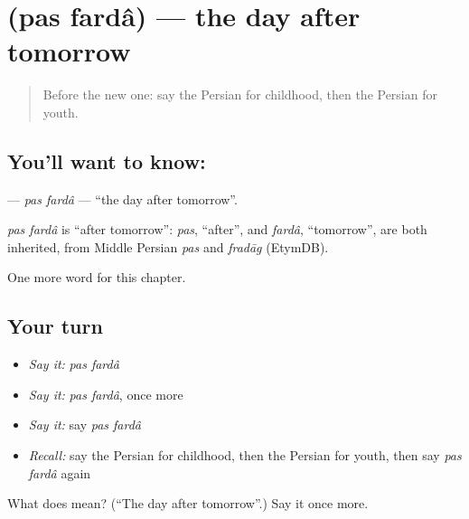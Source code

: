 \section[\texorpdfstring{\fa{پس} \fa{فردا} (pas fardâ)}{پس فردا (pas fardâ)}]{  (pas fardâ) — the day after tomorrow}

\label{lesson:FA-C264-pas-farda}



\begin{quote}
Before the new one: say the Persian for childhood, then the Persian for youth.
\end{quote}

\subsection*{You'll want to know:  }
\textbf{ } — \emph{pas fardâ} — \textquotedblleft{}the day after tomorrow\textquotedblright{}.

\begin{cousinweb}
\emph{pas fardâ} is \textquotedblleft{}after tomorrow\textquotedblright{}: \emph{pas}, \textquotedblleft{}after\textquotedblright{}, and \emph{fardâ}, \textquotedblleft{}tomorrow\textquotedblright{}, are both inherited, from Middle Persian \emph{pas} and \emph{fradāg} (EtymDB).
\end{cousinweb}

\begin{grammarlens}[title={What you've built}]
One more word for this chapter.
\end{grammarlens}

\subsection*{Your turn}
\begin{itemize}
\raggedright
  \item \emph{Say it:} \emph{pas fardâ}
  \item \emph{Say it:} \emph{pas fardâ}, once more
  \item \emph{Say it:} say \emph{pas fardâ}
  \item \emph{Recall:} say the Persian for childhood, then the Persian for youth, then say \emph{pas fardâ} again
\end{itemize}

\begin{tcolorbox}[breakable,colback=teal!4,colframe=teal!35!black,title={Before you move on}]
What does   mean? (\textquotedblleft{}The day after tomorrow\textquotedblright{}.) Say it once more.
\end{tcolorbox}
